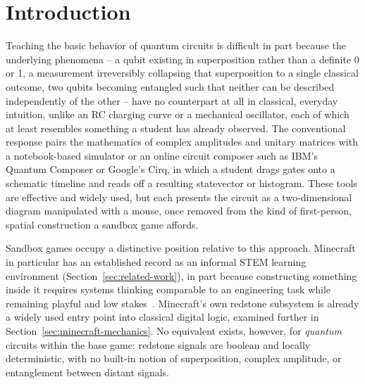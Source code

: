 \section{Introduction}
\label{sec:introduction}

Teaching the basic behavior of quantum circuits is difficult in part because the underlying
phenomena -- a qubit existing in superposition rather than a definite 0 or 1, a measurement
irreversibly collapsing that superposition to a single classical outcome, two qubits becoming
entangled such that neither can be described independently of the other -- have no
counterpart at all in classical, everyday intuition, unlike an RC charging curve or a
mechanical oscillator, each of which at least resembles something a student has already
observed. The conventional response pairs the mathematics of complex amplitudes and unitary
matrices with a notebook-based simulator or an online circuit composer such as IBM's Quantum
Composer or Google's Cirq, in which a student drags gates onto a schematic timeline and reads
off a resulting statevector or histogram. These tools are effective and widely used, but each
presents the circuit as a two-dimensional diagram manipulated with a mouse, once removed from
the kind of first-person, spatial construction a sandbox game affords.

Sandbox games occupy a distinctive position relative to this approach. Minecraft in
particular has an established record as an informal STEM learning environment
(Section~\ref{sec:related-work}), in part because constructing something inside it requires
systems thinking comparable to an engineering task while remaining playful and low
stakes~\cite{nebel2016mining}. Minecraft's own redstone subsystem is already a widely used
entry point into classical digital logic, examined further in
Section~\ref{sec:minecraft-mechanics}. No equivalent exists, however, for \emph{quantum}
circuits within the base game: redstone signals are boolean and locally deterministic, with
no built-in notion of superposition, complex amplitude, or entanglement between distant
signals.

